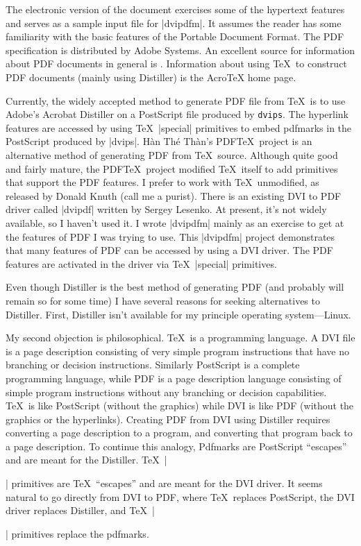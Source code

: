 \endlist

The electronic version of the document exercises
some of the hypertext features and serves as
a sample input file for |dvipdfm|.
It assumes the reader has some familiarity with the basic features
of the Portable Document Format.  The PDF specification
is distributed by Adobe Systems.
An excellent source for information about PDF documents
in general is .  Information about
using \TeX\ to construct PDF documents (mainly using Distiller) is the
AcroTeX home page.

Currently, the widely accepted method to generate PDF file from \TeX\
is to use Adobe's Acrobat Distiller on a PostScript
file produced by {\tt dvips}.
The hyperlink features are accessed by using \TeX\ |special| primitives
to embed pdfmarks in the PostScript produced by |dvips|.
H\`an Th\'e Th\`an's PDF\TeX\ project is an alternative method
of generating PDF from \TeX\ source.
Although quite good and fairly mature, the PDF\TeX\ project
modified \TeX\ itself to add primitives that support the PDF features.
I prefer to work with \TeX\ unmodified, as released by Donald Knuth
(call me a purist).
There is an existing DVI to PDF driver called
|dvipdf| written by Sergey Lesenko.  At present, it's not widely
available, so I haven't used it.  I wrote |dvipdfm|
mainly as an exercise to get at the features
of PDF I was trying to use.  This |dvipdfm| project demonstrates that many features
of PDF can be accessed by using a DVI driver.
The PDF features are activated in the driver via
\TeX\ |special| primitives.

Even though Distiller is the best method of generating PDF (and
probably will remain so for some time) I have several reasons for
seeking alternatives to Distiller.
First, Distiller isn't available for my principle operating
system---Linux.

My second objection is philosophical.
\TeX\ is a programming language.
A DVI file is a page description consisting of very
simple program instructions that have no branching or
decision instructions.
Similarly PostScript is a complete programming language,
while PDF is a page description language consisting
of simple program instructions
without any branching or decision capabilities.
\TeX\ is like PostScript (without the graphics)
while DVI is like PDF (without the graphics or the hyperlinks).
Creating PDF from DVI using Distiller requires converting a page description to a program,
and converting that program back to a page description.
To continue this analogy,
Pdfmarks are PostScript ``escapes'' and are meant for the Distiller.
\TeX\ |\special| primitives are \TeX\ ``escapes'' and are meant for the DVI driver.
It seems natural to go directly from DVI to PDF, where \TeX\ replaces
PostScript, the DVI driver replaces Distiller,
and \TeX\ |\special| primitives replace the pdfmarks.

